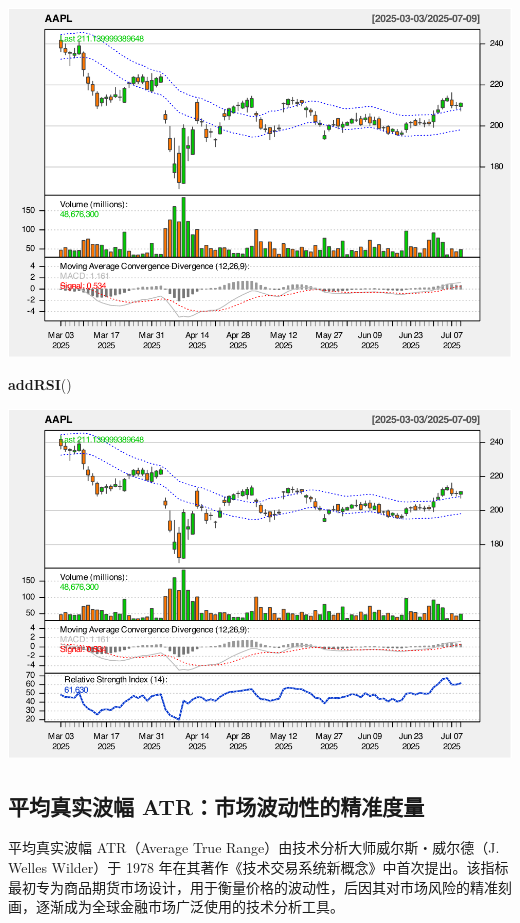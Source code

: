 \documentclass[]{ctexbook}
\newenvironment{Shaded}{\begin{snugshade}}{\end{snugshade}}
\newcommand{\FunctionTok}[1]{\textcolor[rgb]{0.13,0.29,0.53}{\textbf{#1}}}
\newcommand{\NormalTok}[1]{#1}
\begin{document}
\includegraphics[width=0.9\linewidth]{quantmod_files/figure-latex/envol_2-3}

\begin{Shaded}
\begin{Highlighting}[]
\FunctionTok{addRSI}\NormalTok{()}
\end{Highlighting}
\end{Shaded}

\includegraphics[width=0.9\linewidth]{quantmod_files/figure-latex/envol_2-4}

\subsection{平均真实波幅 ATR：市场波动性的精准度量}\label{ux5e73ux5747ux771fux5b9eux6ce2ux5e45-atrux5e02ux573aux6ce2ux52a8ux6027ux7684ux7cbeux51c6ux5ea6ux91cf}

平均真实波幅 ATR（Average True Range）由技术分析大师威尔斯・威尔德（J. Welles Wilder）于 1978 年在其著作《技术交易系统新概念》中首次提出。该指标最初专为商品期货市场设计，用于衡量价格的波动性，后因其对市场风险的精准刻画，逐渐成为全球金融市场广泛使用的技术分析工具。
\end{document}
